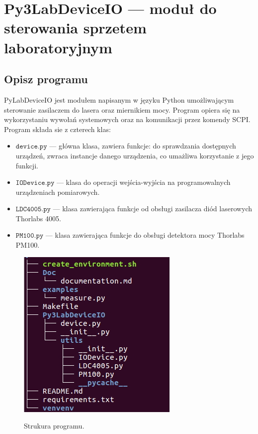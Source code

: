 \documentclass[a4paper, portrait,12pt]{report}
\begin{document}
\newpage

\chapter{Py3LabDeviceIO --- moduł do sterowania sprzetem laboratoryjnym}
\section{Opisz programu}
PyLabDeviceIO jest modułem napisanym w języku Python umożliwającym sterowanie zasilaczem do lasera oraz miernikiem mocy. Program opiera się na wykorzystaniu wywołań systemowych oraz na komunikacji przez komendy SCPI. \\

Program składa sie z czterech klas:
\begin{itemize}
\item $\mathtt{device.py}$ --- główna klasa, zawiera funkcje: do sprawdzania dostępnych urządzeń, 
zwraca instancje danego urządzenia, co umażliwa korzystanie z jego funkcji. 
\item $\mathtt{IODevice.py}$ --- klasa do operacji wejścia-wyjścia na programowalnych urządzeniach pomiarowych.
\item $\mathtt{LDC4005.py}$ --- klasa zawierająca funkcje od obsługi zasilacza diód laserowych Thorlabs 4005.
\item $\mathtt{PM100.py}$ --- klasa zawierająca funkcje do obsługi detektora mocy Thorlabs PM100.
\end{itemize}
\begin{figure}[h]
\center
  \includegraphics[scale=0.45]{tree.png}
  \label{rys1}
  \caption{Strukura programu.} 
\end{figure}
\end{document}
